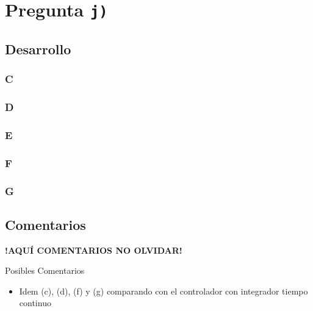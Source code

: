 \section{Pregunta \texttt{j)}}\label{pregunta-j}
\subsection{Desarrollo}

\subsubsection{C} %

\FloatBarrier
\subsubsection{D}%

\FloatBarrier
\subsubsection{E}%

\FloatBarrier
\subsubsection{F}%

\FloatBarrier
\subsubsection{G}%



\FloatBarrier
\subsection{Comentarios}


\textbf{!AQUÍ COMENTARIOS NO OLVIDAR!}

Posibles Comentarios
\begin{itemize}
    \item Idem (c), (d), (f) y (g) comparando con el controlador con integrador tiempo continuo
\end{itemize}